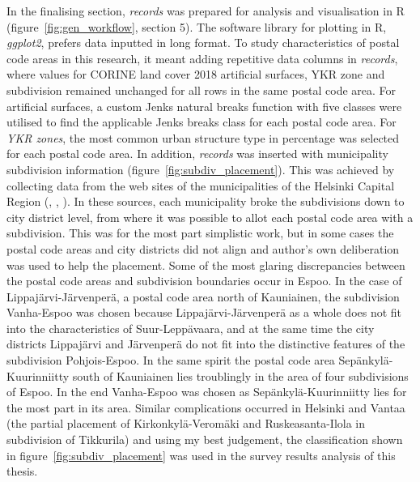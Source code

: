 In the finalising section, \textit{records} was prepared for analysis and visualisation in R (figure~\ref{fig:gen_workflow}, section 5). The software library for plotting in R, \textit{ggplot2}, prefers data inputted in long format. To study characteristics of postal code areas in this research, it meant adding repetitive data columns in \textit{records}, where values for CORINE land cover 2018 artificial surfaces, YKR zone and subdivision remained unchanged for all rows in the same postal code area. For artificial surfaces, a custom Jenks natural breaks function with five classes were utilised to find the applicable Jenks breaks class for each postal code area. For \textit{YKR zones}, the most common urban structure type in percentage was selected for each postal code area. In addition, \textit{records} was inserted with municipality subdivision information (figure~\ref{fig:subdiv_placement}). This was achieved by collecting data from the web sites of the municipalities of the Helsinki Capital Region (\cite{Espoonkaupunki2020}, \cite{Helsinginkaupunkiymparistontoimiala2019}, \cite{Vantaankaupunki2019}). In these sources, each municipality broke the subdivisions down to city district level, from where it was possible to allot each postal code area with a subdivision. This was for the most part simplistic work, but in some cases the postal code areas and city districts did not align and author's own deliberation was used to help the placement. Some of the most glaring discrepancies between the postal code areas and subdivision boundaries occur in Espoo. In the case of Lippajärvi-Järvenperä, a postal code area north of Kauniainen, the subdivision Vanha-Espoo was chosen because Lippajärvi-Järvenperä as a whole does not fit into the characteristics of Suur-Leppävaara, and at the same time the city districts Lippajärvi and Järvenperä do not fit into the distinctive features of the subdivision Pohjois-Espoo. In the same spirit the postal code area Sepänkylä-Kuurinniitty south of Kauniainen lies troublingly in the area of four subdivisions of Espoo. In the end Vanha-Espoo was chosen as Sepänkylä-Kuurinniitty lies for the most part in its area. Similar complications occurred in Helsinki and Vantaa (the partial placement of Kirkonkylä-Veromäki and Ruskeasanta-Ilola in subdivision of Tikkurila) and using my best judgement, the classification shown in figure~\ref{fig:subdiv_placement} was used in the survey results analysis of this thesis.

